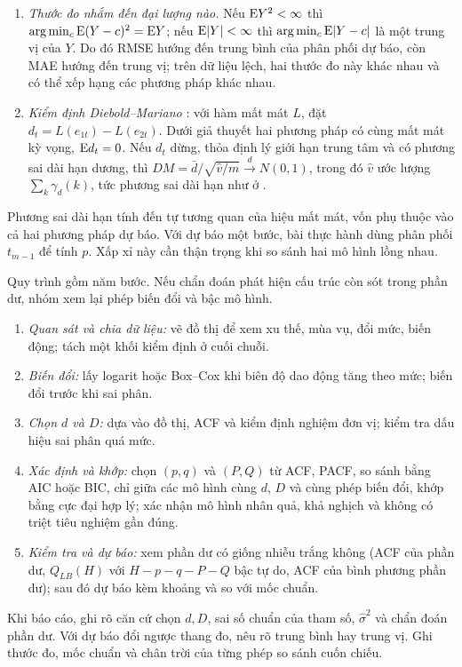 \begin{kq}
\begin{enumerate}[label=(\roman*),leftmargin=*,itemsep=1pt]
\item \emph{Thước đo nhắm đến đại lượng nào.} Nếu $\mathrm{E} Y^2<\infty$ thì $\arg\min_c\mathrm{E}(Y-c)^2=\mathrm{E} Y$; nếu $\mathrm{E}|Y|<\infty$ thì $\arg\min_c\mathrm{E}|Y-c|$ là một trung vị của $Y$. Do đó RMSE hướng đến trung bình của phân phối dự báo, còn MAE hướng đến trung vị; trên dữ liệu lệch, hai thước đo này khác nhau và có thể xếp hạng các phương pháp khác nhau.
\item \emph{Kiểm định Diebold--Mariano} : với hàm mất mát $L$, đặt $d_t=L(e_{1t})-L(e_{2t})$. Dưới giả thuyết hai phương pháp có cùng mất mát kỳ vọng, $\mathrm{E} d_t=0$. Nếu $d_t$ dừng, thỏa định lý giới hạn trung tâm và có phương sai dài hạn dương, thì $DM=\bar d\big/\sqrt{\hat v/m}\xrightarrow{d}N(0,1)$, trong đó $\hat v$ ước lượng $\sum_k\gamma_d(k)$, tức phương sai dài hạn như ở .
\end{enumerate}
\end{kq}
Phương sai dài hạn tính đến tự tương quan của hiệu mất mát, vốn phụ thuộc vào cả hai phương pháp dự báo. Với dự báo một bước, bài thực hành dùng phân phối $t_{m-1}$ để tính $p$. Xấp xỉ này cần thận trọng khi so sánh hai mô hình lồng nhau.

Quy trình gồm năm bước. Nếu chẩn đoán phát hiện cấu trúc còn sót trong phần dư, nhóm xem lại phép biến đổi và bậc mô hình.
\begin{enumerate}[label=\textbf{Bước \arabic*.},leftmargin=2.2cm,itemsep=1pt]
\item \emph{Quan sát và chia dữ liệu:} vẽ đồ thị để xem xu thế, mùa vụ, đổi mức, biến động; tách một khối kiểm định ở cuối chuỗi.
\item \emph{Biến đổi:} lấy logarit hoặc Box--Cox khi biên độ dao động tăng theo mức; biến đổi trước khi sai phân.
\item \emph{Chọn $d$ và $D$:} dựa vào đồ thị, ACF và kiểm định nghiệm đơn vị; kiểm tra dấu hiệu sai phân quá mức.
\item \emph{Xác định và khớp:} chọn $(p,q)$ và $(P,Q)$ từ ACF, PACF, so sánh bằng AIC hoặc BIC, chỉ giữa các mô hình cùng $d$, $D$ và cùng phép biến đổi, khớp bằng cực đại hợp lý; xác nhận mô hình nhân quả, khả nghịch và không có triệt tiêu nghiệm gần đúng.
\item \emph{Kiểm tra và dự báo:} xem phần dư có giống nhiễu trắng không (ACF của phần dư, $Q_{LB}(H)$ với $H-p-q-P-Q$ bậc tự do, ACF của bình phương phần dư); sau đó dự báo kèm khoảng và so với mốc chuẩn.
\end{enumerate}
Khi báo cáo, ghi rõ căn cứ chọn $d,D$, sai số chuẩn của tham số, $\hat\sigma^2$ và chẩn đoán phần dư. Với dự báo đổi ngược thang đo, nêu rõ trung bình hay trung vị. Ghi thước đo, mốc chuẩn và chân trời của từng phép so sánh cuốn chiếu.
